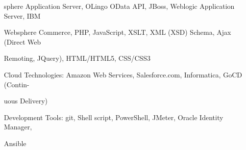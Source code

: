 \documentclass[
]{article}
\begin{document}
\protect\hypertarget{f3}{}{sphere Application Server, OLingo OData API,
JBoss, Weblogic Application Server, IBM}

\protect\hypertarget{f3}{}{Websphere Commerce, PHP, JavaScript, XSLT,
XML (XSD) Schema, Ajax (Direct Web}

\protect\hypertarget{f3}{}{Remoting, JQuery), HTML/HTML5, CSS/CSS3}

\protect\hypertarget{f1}{}{Cloud Technologies:
}\protect\hypertarget{f3}{}{Amazon Web Services, Salesforce.com,
Informatica, GoCD (Contin}\protect\hypertarget{f2}{}{-}

\protect\hypertarget{f3}{}{uous Delivery)}

\protect\hypertarget{f1}{}{Development Tools:
}\protect\hypertarget{f3}{}{git, Shell script, PowerShell, JMeter,
Oracle Identity Manager,}

\protect\hypertarget{f2}{}{Ansible}
\end{document}
